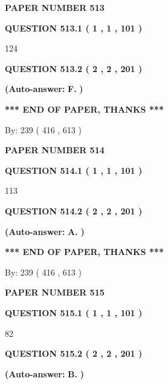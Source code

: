 \documentclass{ctexart}
\begin{document}
   
 {\textbf{ \Large{ PAPER NUMBER  513  }}}
   
   
   
   
  
  
{\textbf{\large{QUESTION
513.1 
 ( 1 , 1 , 101 )
}}}

124
  
  
{\textbf{\large{QUESTION
513.2 
 ( 2 , 2 , 201 )
}}}
 
 
{\textbf{(Auto-answer:}}
{\textbf{\large{
F.}}}
{\textbf{)}}
 
 
   
   
   
   
\vspace{1.0in} 
{\textbf{\large{ *** END OF PAPER, THANKS *** }}} 
   
   
\hspace{1.0in} By: 
 239 ( 416 ,  613 )
   
   
   
   
\newpage 
\setcounter{page}{ 
   514001 } 
   
   
 {\textbf{ \Large{ PAPER NUMBER  514  }}}
   
   
   
   
  
  
{\textbf{\large{QUESTION
514.1 
 ( 1 , 1 , 101 )
}}}

113
  
  
{\textbf{\large{QUESTION
514.2 
 ( 2 , 2 , 201 )
}}}
 
 
{\textbf{(Auto-answer:}}
{\textbf{\large{
A.}}}
{\textbf{)}}
 
 
   
   
   
   
\vspace{1.0in} 
{\textbf{\large{ *** END OF PAPER, THANKS *** }}} 
   
   
\hspace{1.0in} By: 
 239 ( 416 ,  613 )
   
   
   
   
\newpage 
\setcounter{page}{ 
   515001 } 
   
   
 {\textbf{ \Large{ PAPER NUMBER  515  }}}
   
   
   
   
  
  
{\textbf{\large{QUESTION
515.1 
 ( 1 , 1 , 101 )
}}}

82
  
  
{\textbf{\large{QUESTION
515.2 
 ( 2 , 2 , 201 )
}}}
 
 
{\textbf{(Auto-answer:}}
{\textbf{\large{
B.}}}
{\textbf{)}}
 
\end{document}
